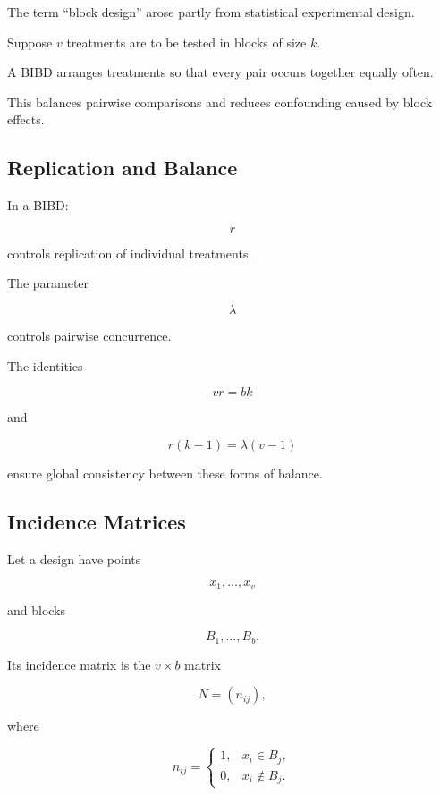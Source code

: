 The term ``block design'' arose partly from statistical experimental
design.

Suppose \(v\) treatments are to be tested in blocks of size \(k\).

A BIBD arranges treatments so that every pair occurs together equally
often.

This balances pairwise comparisons and reduces confounding caused by
block effects.

\subsection{Replication and Balance}
\label{subsec:replication-balance}

In a BIBD:

\[
r
\]

controls replication of individual treatments.

The parameter

\[
\lambda
\]

controls pairwise concurrence.

The identities

\[
vr=bk
\]

and

\[
r(k-1)=\lambda(v-1)
\]

ensure global consistency between these forms of balance.

\subsection{Incidence Matrices}
\label{subsec:design-incidence-matrices}

Let a design have points

\[
x_1,\ldots,x_v
\]

and blocks

\[
B_1,\ldots,B_b.
\]

Its incidence matrix is the \(v\times b\) matrix

\[
N=(n_{ij}),
\]

where

\[
\boxed{
n_{ij}
=
\begin{cases}
1,&x_i\in B_j,\\
0,&x_i\notin B_j.
\end{cases}
}
\]

